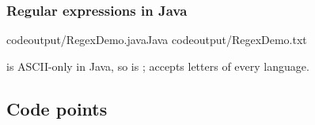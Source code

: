 \documentclass[aspectratio=169,10pt,compress]{beamer}
\begin{document}




\begin{frame}[t,fragile] \frametitle{Regular expressions in Java}

	\lstcodeoverlaystep
		[basicstyle=\ttfamily\tiny]
		[basicstyle=\ttfamily\tiny][0.38\textwidth]{10.2cm,2.25cm}
			{codeoutput/RegexDemo.java}{Java}
			{codeoutput/RegexDemo.txt}

  \vspace{0.2em}
  \small {} is ASCII-only in Java, so  is ;
   accepts letters of every language.
\end{frame}


\subsection[Code points]{Code points}
\end{document}
